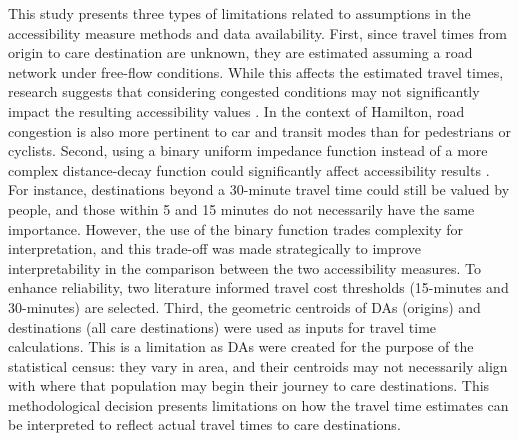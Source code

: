 \documentclass[
  authoryear,
  preprint,
  3p]{elsarticle}
\begin{document}
This study presents three types of limitations related to assumptions in
the accessibility measure methods and data availability. First, since
travel times from origin to care destination are unknown, they are
estimated assuming a road network under free-flow conditions. While this
affects the estimated travel times, research suggests that considering
congested conditions may not significantly impact the resulting
accessibility values \citep{yiannakouliasEstimatingEffectTurn2013}. In
the context of Hamilton, road congestion is also more pertinent to car
and transit modes than for pedestrians or cyclists. Second, using a
binary uniform impedance function instead of a more complex
distance-decay function could significantly affect accessibility results
\citep{kapatsilaResolvingAccessibilityDilemma2023}. For instance,
destinations beyond a 30-minute travel time could still be valued by
people, and those within 5 and 15 minutes do not necessarily have the
same importance. However, the use of the binary function trades
complexity for interpretation, and this trade-off was made strategically
to improve interpretability in the comparison between the two
accessibility measures. To enhance reliability, two literature informed
travel cost thresholds (15-minutes and 30-minutes) are selected. Third,
the geometric centroids of DAs (origins) and destinations (all care
destinations) were used as inputs for travel time calculations. This is
a limitation as DAs were created for the purpose of the statistical
census: they vary in area, and their centroids may not necessarily align
with where that population may begin their journey to care destinations.
This methodological decision presents limitations on how the travel time
estimates can be interpreted to reflect actual travel times to care
destinations.
\end{document}

